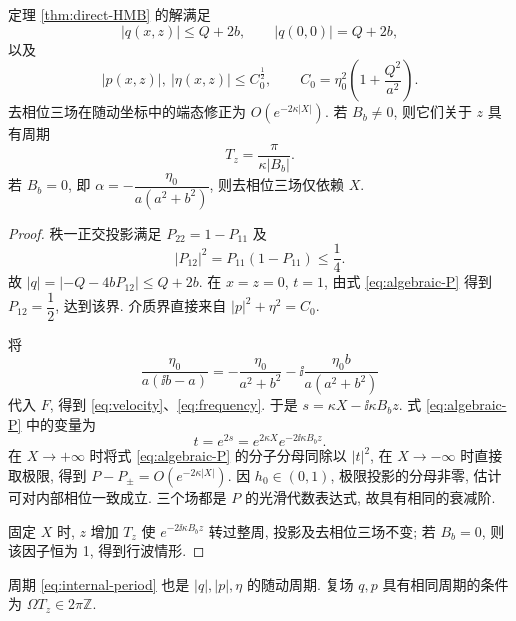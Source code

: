 \begin{proposition}[一轨道解的幅值与局部化]\label{prop:wave-properties}
定理 \ref{thm:direct-HMB} 的解满足
\begin{equation}\label{eq:amplitude-bound}
|q(x,z)|\le Q+2b,\qquad |q(0,0)|=Q+2b,
\end{equation}
以及
\begin{equation}\label{eq:medium-bound}
|p(x,z)|,\ |\eta(x,z)|\le C_0^{\frac{1}{2}},\qquad
C_0=\eta_0^2\left(1+\dfrac{Q^2}{a^2}\right).
\end{equation}
去相位三场在随动坐标中的端态修正为 $O(e^{-2\kappa|X|})$. 若 $B_b\ne0$, 则它们关于 $z$ 具有周期
\begin{equation}\label{eq:internal-period}
T_z=\dfrac{\pi}{\kappa|B_b|}.
\end{equation}
若 $B_b=0$, 即 $\alpha=-\dfrac{\eta_0}{a(a^2+b^2)}$, 则去相位三场仅依赖 $X$.
\end{proposition}
\begin{proof}
秩一正交投影满足 $P_{22}=1-P_{11}$ 及
\[
|P_{12}|^2=P_{11}(1-P_{11})\le\dfrac{1}{4}.
\]
故 $|q|=|-Q-4bP_{12}|\le Q+2b$. 在 $x=z=0$, $t=1$, 由式 \eqref{eq:algebraic-P} 得到 $P_{12}=\dfrac{1}{2}$, 达到该界. 介质界直接来自 $|p|^2+\eta^2=C_0$.

将
\[
\dfrac{\eta_0}{a(\ii b-a)}
=-\dfrac{\eta_0}{a^2+b^2}
-\ii\dfrac{\eta_0b}{a(a^2+b^2)}
\]
代入 $F$, 得到 \eqref{eq:velocity}、\eqref{eq:frequency}. 于是
$s=\kappa X-\ii\kappa B_bz$. 式 \eqref{eq:algebraic-P} 中的变量为
\[
t=e^{2s}=e^{2\kappa X}e^{-2\ii\kappa B_bz}.
\]
在 $X\to+\infty$ 时将式 \eqref{eq:algebraic-P} 的分子分母同除以 $|t|^2$, 在 $X\to-\infty$ 时直接取极限, 得到 $P-P_\pm=O(e^{-2\kappa|X|})$. 因 $h_0\in(0,1)$, 极限投影的分母非零, 估计可对内部相位一致成立. 三个场都是 $P$ 的光滑代数表达式, 故具有相同的衰减阶.

固定 $X$ 时, $z$ 增加 $T_z$ 使 $e^{-2\ii\kappa B_bz}$ 转过整周, 投影及去相位三场不变; 若 $B_b=0$, 则该因子恒为 1, 得到行波情形.
\end{proof}

周期 \eqref{eq:internal-period} 也是 $|q|,|p|,\eta$ 的随动周期. 复场 $q,p$ 具有相同周期的条件为 $\Omega T_z\in2\pi\mathbb Z$.

